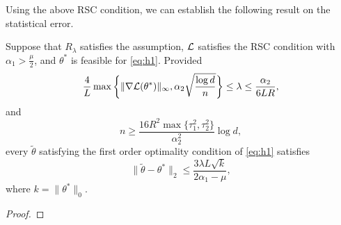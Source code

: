 Using the above RSC condition,
we can establish the following result on the statistical error.
\begin{thm}
Suppose that $R_\lambda$ satisfies the assumption,
$\mathcal{L}$ satisfies the RSC condition with $\alpha_1>\frac{\mu}{2}$,
and $\theta^*$ is feasible for \eqref{eq:h1}.
Provided
\begin{equation}
    \frac{4}{L}\max\bigg\{\|\nabla\mathcal{L}(\theta^*)\|_\infty,
        \alpha_2\sqrt{\frac{\log d}{n}}\bigg\}\le\lambda\le\frac{\alpha_2}{{6LR}},
\end{equation}
and
\begin{equation}
    n\ge\frac{16R^2\max\{\tau_1^2,\tau_2^2\}}{\alpha_2^2}\log d,
\end{equation}
every $\tilde\theta$ satisfying the first order optimality condition of
\eqref{eq:h1} satisfies
\begin{equation}
    \|\tilde\theta-\theta^*\|_2\le\frac{3\lambda L\sqrt{k}}{2\alpha_1-\mu},
\end{equation}
where $k=\|\theta^*\|_0$.
\end{thm}
\begin{proof}
\todo
\end{proof}
